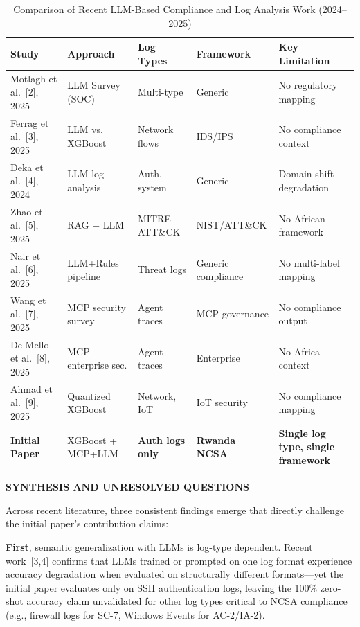 \documentclass[12pt]{article}
\begin{document}
\begin{table}[h]
\centering
\caption{Comparison of Recent LLM-Based Compliance and Log Analysis Work (2024--2025)}
\label{tab:lit_comparison}
\begin{tabular}{@{}p{3cm}p{2.5cm}p{2.5cm}p{3cm}p{3cm}@{}}
\toprule
\textbf{Study} & \textbf{Approach} & \textbf{Log Types} & \textbf{Framework} & \textbf{Key Limitation} \\
\midrule
Motlagh et al.~[2], 2025 & LLM Survey (SOC) & Multi-type & Generic & No regulatory mapping \\
Ferrag et al.~[3], 2025 & LLM vs. XGBoost & Network flows & IDS/IPS & No compliance context \\
Deka et al.~[4], 2024 & LLM log analysis & Auth, system & Generic & Domain shift degradation \\
Zhao et al.~[5], 2025 & RAG + LLM & MITRE ATT\&CK & NIST/ATT\&CK & No African framework \\
Nair et al.~[6], 2025 & LLM+Rules pipeline & Threat logs & Generic compliance & No multi-label mapping \\
Wang et al.~[7], 2025 & MCP security survey & Agent traces & MCP governance & No compliance output \\
De Mello et al.~[8], 2025 & MCP enterprise sec. & Agent traces & Enterprise & No Africa context \\
Ahmad et al.~[9], 2025 & Quantized XGBoost & Network, IoT & IoT security & No compliance mapping \\
\textbf{Initial Paper} & XGBoost + MCP+LLM & \textbf{Auth logs only} & \textbf{Rwanda NCSA} & \textbf{Single log type, single framework} \\
\bottomrule
\end{tabular}
\end{table}

\bigskip

\textbf{SYNTHESIS AND UNRESOLVED QUESTIONS}

Across recent literature, three consistent findings emerge that directly challenge the initial paper's contribution claims:

\textbf{First}, semantic generalization with LLMs is log-type dependent. Recent work~[3,4] confirms that LLMs trained or prompted on one log format experience accuracy degradation when evaluated on structurally different formats---yet the initial paper evaluates only on SSH authentication logs, leaving the 100\% zero-shot accuracy claim unvalidated for other log types critical to NCSA compliance (e.g., firewall logs for SC-7, Windows Events for AC-2/IA-2).
\end{document}
